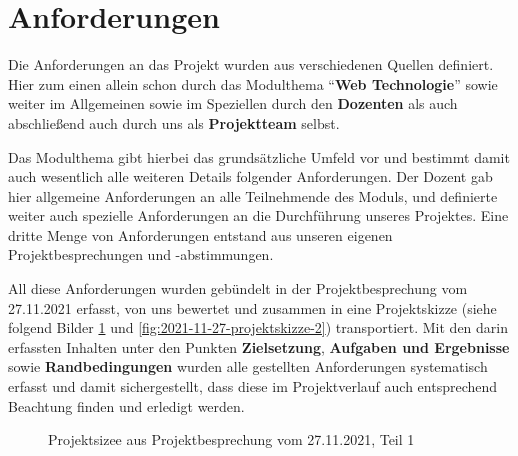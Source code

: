 
\section{Anforderungen} %



Die Anforderungen an das Projekt wurden aus verschiedenen Quellen definiert. Hier zum einen allein schon durch das Modulthema \enquote{\textbf{Web Technologie}} sowie weiter im Allgemeinen sowie im Speziellen durch den \textbf{Dozenten} als auch abschließend auch durch uns als \textbf{Projektteam} selbst. 

Das Modulthema gibt hierbei das grundsätzliche Umfeld vor und bestimmt damit auch wesentlich alle weiteren Details folgender Anforderungen. Der Dozent gab hier allgemeine Anforderungen an alle Teilnehmende des Moduls, und definierte weiter auch spezielle Anforderungen an die Durchführung unseres Projektes. Eine dritte Menge von Anforderungen entstand aus unseren eigenen Projektbesprechungen und -abstimmungen.  

All diese Anforderungen wurden gebündelt in der Projektbesprechung vom 27.11.2021 erfasst, von uns bewertet und zusammen in eine Projektskizze (siehe folgend Bilder \ref{fig:2021-11-27-projektskizze-1} und \ref{fig:2021-11-27-projektskizze-2}) transportiert. Mit den darin erfassten Inhalten unter den Punkten \textbf{Zielsetzung}, \textbf{Aufgaben und Ergebnisse} sowie \textbf{Randbedingungen} wurden alle gestellten Anforderungen systematisch erfasst und damit sichergestellt, dass diese im Projektverlauf auch entsprechend Beachtung finden und erledigt werden. 


\begin{figure}[H]
    \centering
    \caption{Projektsizee aus Projektbesprechung vom 27.11.2021, Teil 1}
    \label{fig:2021-11-27-projektskizze-1}
\end{figure}


